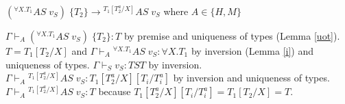 \begin{case}
$(^{\forall X.T_{1}}AS\;v_{S})\;\lbrace T_{2}\rbrace\rightarrow{^{T_{1}[T_{2}^{a}/X]}A}S\;v_{S}$ where $A\in\lbrace H,M\rbrace$

$\Gamma\vdash_{A}(^{\forall X.T_{1}}AS\;v_{S})\;\lbrace T_{2}\rbrace:T$ by premise and uniqueness of types (Lemma \ref{uot}).  $T=T_{1}[T_{2}/X]$ and $\Gamma\vdash_{A}{^{\forall X.T_{1}}A}S\;v_{S}:\forall X.T_{1}$ by inversion (Lemma \ref{i}) and uniqueness of types.  $\Gamma\vdash_{S}v_{S}:TST$ by inversion.  $\Gamma\vdash_{A}{^{T_{1}[T_{2}^{a}/X]}A}S\;v_{S}:T_{1}[T_{2}^{a}/X][T_{i}/T_{i}^{a}]$ by inversion and uniqueness of types.  $\Gamma\vdash_{A}{^{T_{1}[T_{2}^{a}/X]}A}S\;v_{S}:T$ because $T_{1}[T_{2}^{a}/X][T_{i}/T_{i}^{a}]=T_{1}[T_{2}/X]=T$.
\end{case}